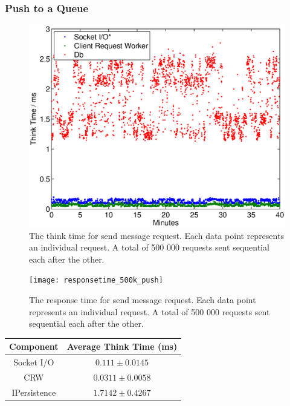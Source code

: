 \documentclass{article}
\begin{document}
        \subsubsection{Push to a Queue}
        
            \begin{figure}[H]
                \hspace{-1.5cm}
                \includegraphics[scale=0.50]{thinktime_500k_push}
                \caption{The think time for send message request. Each data point represents an individual request. A total of 500 000 requests sent sequential each after the other.}
                \label{fig:thinktime_500k_push}
            \end{figure}
            
            \begin{figure}[H]
                \hspace{-1.5cm}
                \texttt{[image: responsetime\_500k\_push]}
                \caption{The response time for send message request. Each data point represents an individual request. A total of 500 000 requests sent sequential each after the other.}
                \label{fig:responsetime_500k_push}
            \end{figure}
                
            \begin{tabular}{|c|c|}
                \hline 
                \textbf{Component} & \textbf{Average Think Time} (ms) \\ 
                \hline 
                Socket I/O & $0.111 \pm 0.0145$\\ 
                \hline 
                CRW & $0.0311 \pm 0.0058$\\ 
                \hline 
                IPersistence & $1.7142 \pm 0.4267$\\ 
                \hline 
            \end{tabular} 
            
\end{document}
